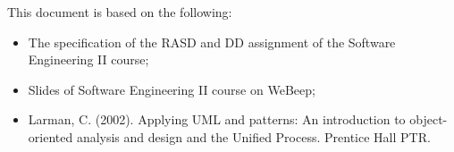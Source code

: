 This document is based on the following:
\begin{itemize}
    \item The specification of the RASD and DD assignment of the Software Engineering II course;
    \item Slides of Software Engineering II course on WeBeep;
    \item Larman, C. (2002). Applying UML and patterns: An introduction to object-oriented analysis and design and the Unified Process. Prentice Hall PTR. 
\end{itemize}